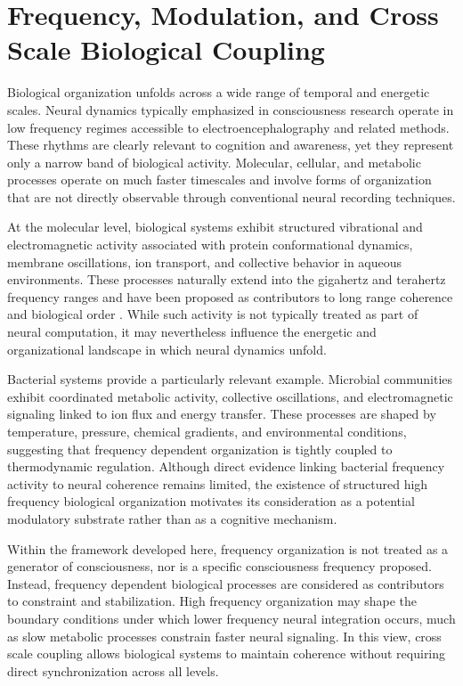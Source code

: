 \documentclass[12pt,letterpaper]{article}
\begin{document}
\section{Frequency, Modulation, and Cross Scale Biological Coupling}

Biological organization unfolds across a wide range of temporal and energetic scales. Neural dynamics typically emphasized in consciousness research operate in low frequency regimes accessible to electroencephalography and related methods. These rhythms are clearly relevant to cognition and awareness, yet they represent only a narrow band of biological activity. Molecular, cellular, and metabolic processes operate on much faster timescales and involve forms of organization that are not directly observable through conventional neural recording techniques.

At the molecular level, biological systems exhibit structured vibrational and electromagnetic activity associated with protein conformational dynamics, membrane oscillations, ion transport, and collective behavior in aqueous environments. These processes naturally extend into the gigahertz and terahertz frequency ranges and have been proposed as contributors to long range coherence and biological order \cite{froehlich1968, pokorny2004}. While such activity is not typically treated as part of neural computation, it may nevertheless influence the energetic and organizational landscape in which neural dynamics unfold.

Bacterial systems provide a particularly relevant example. Microbial communities exhibit coordinated metabolic activity, collective oscillations, and electromagnetic signaling linked to ion flux and energy transfer. These processes are shaped by temperature, pressure, chemical gradients, and environmental conditions, suggesting that frequency dependent organization is tightly coupled to thermodynamic regulation. Although direct evidence linking bacterial frequency activity to neural coherence remains limited, the existence of structured high frequency biological organization motivates its consideration as a potential modulatory substrate rather than as a cognitive mechanism.

Within the framework developed here, frequency organization is not treated as a generator of consciousness, nor is a specific consciousness frequency proposed. Instead, frequency dependent biological processes are considered as contributors to constraint and stabilization. High frequency organization may shape the boundary conditions under which lower frequency neural integration occurs, much as slow metabolic processes constrain faster neural signaling. In this view, cross scale coupling allows biological systems to maintain coherence without requiring direct synchronization across all levels.
\end{document}
